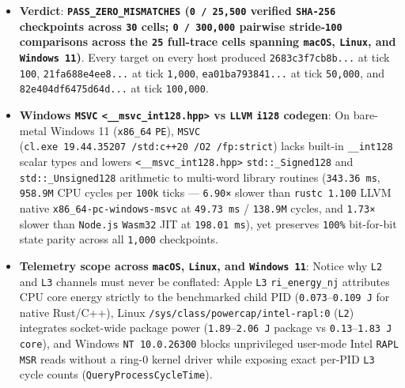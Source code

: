 \documentclass[10pt,letterpaper]{article}
\providecommand{\tightlist}{\setlength{\itemsep}{1pt}\setlength{\parskip}{0pt}}
\begin{document}
\begin{itemize}
\tightlist
\item
  \textbf{Verdict}: \textbf{\texttt{PASS\_\allowbreak{}ZERO\_\allowbreak{}MISMATCHES}
  (\texttt{0\ /\allowbreak{}\ 25,\allowbreak{}500} verified \texttt{SHA-256} checkpoints across
  \texttt{30} cells; \texttt{0\ /\allowbreak{}\ 300,\allowbreak{}000} pairwise stride-\texttt{100}
  comparisons across the \texttt{25} full-trace cells spanning
  \texttt{macOS}, \texttt{Linux}, and \texttt{Windows\ 11})}. Every
  target on every host produced \texttt{2683c3f7cb8b.\allowbreak{}.\allowbreak{}.\allowbreak{}} at tick
  \texttt{100}, \texttt{21fa688e4ee8.\allowbreak{}.\allowbreak{}.\allowbreak{}} at tick \texttt{1,000},
  \texttt{ea01ba793841.\allowbreak{}.\allowbreak{}.\allowbreak{}} at tick \texttt{50,000}, and
  \texttt{82e404df\allowbreak{}6475d64d.\allowbreak{}.\allowbreak{}.\allowbreak{}} at tick \texttt{100,000}.
\item
  \textbf{Windows \texttt{MSVC}
  \texttt{\textless{}\_\_msvc\_int128.hpp\textgreater{}} vs
  \texttt{LLVM} \texttt{i128} codegen}: On bare-metal Windows 11
  (\texttt{x86\_64} \texttt{PE}), \texttt{MSVC}
  (\texttt{cl.\allowbreak{}exe\ 19.\allowbreak{}44.\allowbreak{}35207\ /\allowbreak{}std:c++20\ /\allowbreak{}O2\ /\allowbreak{}fp:strict}) lacks
  built-in \texttt{\_\allowbreak{}\_\allowbreak{}int128} scalar types and lowers
  \texttt{\textless{}\_\_msvc\_int128.hpp\textgreater{}}
  \texttt{std::\_\allowbreak{}Signed128} and \texttt{std::\_\allowbreak{}Unsigned128} arithmetic
  to multi-word library routines (\texttt{343.\allowbreak{}36\ ms}, \texttt{958.9M}
  CPU cycles per \texttt{100k} ticks --- \texttt{6.90×} slower than
  \texttt{rustc\ 1.\allowbreak{}100} LLVM native \texttt{x86\_\allowbreak{}64-\allowbreak{}pc-\allowbreak{}windows-\allowbreak{}msvc} at
  \texttt{49.73\ ms} / \texttt{138.9M} cycles, and \texttt{1.73×} slower
  than \texttt{Node.js} \texttt{Wasm32} JIT at \texttt{198.\allowbreak{}01\ ms}), yet
  preserves \texttt{100\%} bit-for-bit state parity across all
  \texttt{1,000} checkpoints.
\item
  \textbf{Telemetry scope across \texttt{macOS}, \texttt{Linux}, and
  \texttt{Windows\ 11}}: Notice why \texttt{L2} and \texttt{L3} channels
  must never be conflated: Apple \texttt{L3} \texttt{ri\_\allowbreak{}energy\_\allowbreak{}nj}
  attributes CPU core energy strictly to the benchmarked child PID
  (\texttt{0.073}--\texttt{0.109\ J} for native Rust/C++), Linux
  \texttt{/\allowbreak{}sys/\allowbreak{}class/\allowbreak{}powercap/\allowbreak{}intel-\allowbreak{}rapl:0} (\texttt{L2}) integrates
  socket-wide package power (\texttt{1.89}--\texttt{2.06\ J} package vs
  \texttt{0.13}--\texttt{1.83\ J} \texttt{core}), and Windows
  \texttt{NT\ 10.\allowbreak{}0.\allowbreak{}26300} blocks unprivileged user-mode Intel
  \texttt{RAPL} \texttt{MSR} reads without a ring-0 kernel driver while
  exposing exact per-PID \texttt{L3} cycle counts
  (\texttt{QueryProcessCycleTime}).
\end{itemize}
\end{document}
